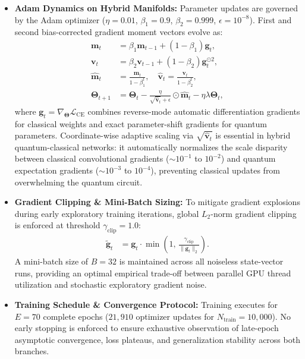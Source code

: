 \documentclass[journal]{IEEEtran}
\begin{document}
\begin{itemize}
    \item \textbf{Adam Dynamics on Hybrid Manifolds:} Parameter updates are governed by the Adam optimizer ($\eta = 0.01$, $\beta_1 = 0.9$, $\beta_2 = 0.999$, $\epsilon = 10^{-8}$). First and second bias-corrected gradient moment vectors evolve as:
    \begin{align}
    \mathbf{m}_t &= \beta_1 \mathbf{m}_{t-1} + (1-\beta_1) \mathbf{g}_t, \nonumber \\
    \mathbf{v}_t &= \beta_2 \mathbf{v}_{t-1} + (1-\beta_2) \mathbf{g}_t^{\odot 2}, \nonumber \\
    \hat{\mathbf{m}}_t &= \frac{\mathbf{m}_t}{1-\beta_1^t}, \quad \hat{\mathbf{v}}_t = \frac{\mathbf{v}_t}{1-\beta_2^t}, \nonumber \\
    \boldsymbol{\Theta}_{t+1} &= \boldsymbol{\Theta}_t - \frac{\eta}{\sqrt{\hat{\mathbf{v}}_t} + \epsilon} \odot \hat{\mathbf{m}}_t - \eta \lambda \boldsymbol{\Theta}_t,
    \label{eq:adam_hybrid_update}
    \end{align}
    where $\mathbf{g}_t = \nabla_{\boldsymbol{\Theta}} \mathcal{L}_{\mathrm{CE}}$ combines reverse-mode automatic differentiation gradients for classical weights and exact parameter-shift gradients for quantum parameters. Coordinate-wise adaptive scaling via $\sqrt{\hat{\mathbf{v}}_t}$ is essential in hybrid quantum-classical networks: it automatically normalizes the scale disparity between classical convolutional gradients ($\sim 10^{-1}$ to $10^{-2}$) and quantum expectation gradients ($\sim 10^{-3}$ to $10^{-4}$), preventing classical updates from overwhelming the quantum circuit.

    \item \textbf{Gradient Clipping \& Mini-Batch Sizing:} To mitigate gradient explosions during early exploratory training iterations, global $L_2$-norm gradient clipping is enforced at threshold $\gamma_{\mathrm{clip}} = 1.0$:
    \begin{align}
    \tilde{\mathbf{g}}_t &= \mathbf{g}_t \cdot \min\left(1, \, \frac{\gamma_{\mathrm{clip}}}{\|\mathbf{g}_t\|_2}\right).
    \label{eq:gradient_clipping}
    \end{align}
    A mini-batch size of $B = 32$ is maintained across all noiseless state-vector runs, providing an optimal empirical trade-off between parallel GPU thread utilization and stochastic exploratory gradient noise.

    \item \textbf{Training Schedule \& Convergence Protocol:} Training executes for $E = 70$ complete epochs ($21{,}910$ optimizer updates for $N_{\mathrm{train}} = 10{,}000$). No early stopping is enforced to ensure exhaustive observation of late-epoch asymptotic convergence, loss plateaus, and generalization stability across both branches.


\end{itemize}
\end{document}
